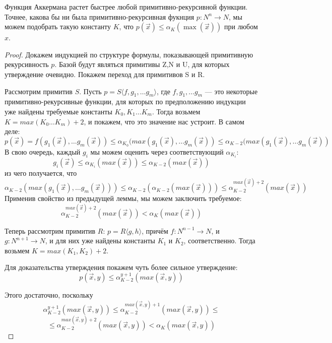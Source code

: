 \begin{theorem}
Функция Аккермана растет быстрее любой примитивно-рекурсивной функции. Точнее,
какова бы ни была примитивно-рекурсивная фукнция $p: N^n \rightarrow N$, 
мы можем подобрать такую константу $K$, что 
$p(\overrightarrow{x}) \le \alpha_K(\max(\overrightarrow{x}))$ 
при любом $x$. 
\end{theorem}

\begin{proof}
Докажем индукцией по структуре формулы, показывающей примитивную 
рекурсивность $p$.
Базой будут являться примитивы Z,N и U, для которых утверждение очевидно.
Покажем переход для примитивов S и R.

Рассмотрим примитив $S$. Пусть $p = S\langle f,g_1,\dots g_m \rangle$,
где $f, g_1, \dots g_m$ --- это некоторые примитивно-рекурсивные функции, 
для которых по предположению индукции уже найдены требуемые константы 
$K_0, K_1 \dots K_m$.
Тогда возьмем $K = max (K_0 \dots K_m)+2$, и покажем, что это значение нас
устроит.
В самом деле: 
$$p(\overrightarrow{x}) = f(g_1(\overrightarrow{x}), \dots g_m(\overrightarrow{x}))
\le \alpha_{K_0}(max (g_1(\overrightarrow{x}), \dots g_m(\overrightarrow{x})) 
\le \alpha_{K-2}(max (g_1(\overrightarrow{x}), \dots g_m(\overrightarrow{x}))$$
В свою очередь, каждый $g_i$ мы можем оценить через соответствующий $\alpha_{K_i}$:
$$g_i(\overrightarrow{x}) \le \alpha_{K_i}(max(\overrightarrow{x})) \le \alpha_{K-2}(max(\overrightarrow{x}))$$
из чего получается, что 
$$\alpha_{K-2}(max (g_1(\overrightarrow{x}), \dots g_m(\overrightarrow{x}))) \le 
\alpha_{K-2}(\alpha_{K-2}(max(\overrightarrow{x}))) \le \alpha_{K-2}^{max(\overrightarrow{x})+2}(max(\overrightarrow{x}))$$
Применив свойство из предыдущей леммы, мы можем заключить требуемое:
$$\alpha_{K-2}^{max(\overrightarrow{x})+2}(max(\overrightarrow{x})) < \alpha_K(max(\overrightarrow{x}))$$

Теперь рассмотрим примитив $R$: $p = R\langle g,h \rangle$,
причём $f: N^{n-1} \rightarrow N$, и $g: N^{n+1} \rightarrow N$,
и для них уже найдены константы $K_1$ и $K_2$, соответственно.
Тогда возьмем $K = max(K_1, K_2)+2$.

Для доказательства утверждения покажем чуть более сильное утверждение:
$$p(\overrightarrow{x},y) \le \alpha_{K-2}^{y+1}(max(\overrightarrow{x},y))$$

Этого достаточно, поскольку 
$$\alpha_{K-2}^{y+1}(max(\overrightarrow{x},y)) \le
\alpha_{K-2}^{max(\overrightarrow{x},y)+1}(max(\overrightarrow{x},y)) \le$$
$$\le \alpha_{K-2}^{max(\overrightarrow{x},y)+2}(max(\overrightarrow{x},y)) <
\alpha_K(max(\overrightarrow{x},y))$$


\end{proof}
